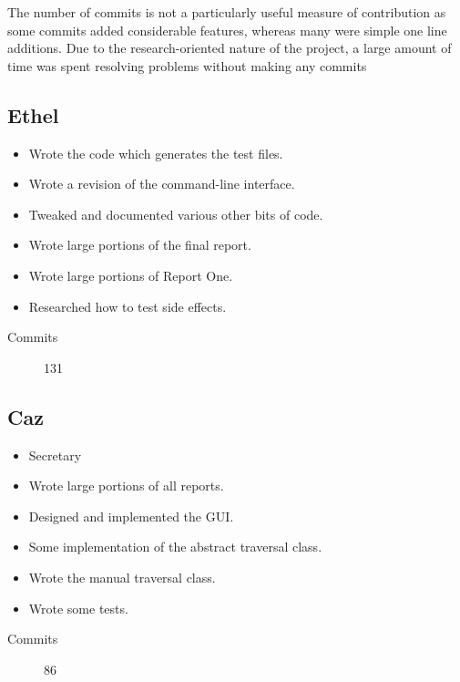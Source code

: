   The number of commits is not a particularly useful measure of contribution as some commits added considerable features, whereas many were simple one line additions. 
  Due to the research-oriented nature of the project, a large amount of time was spent resolving problems without making any commits

  \subsection{Ethel}
    \begin{itemize}
      \item Wrote the code which generates the test files.
      \item Wrote a revision of the command-line interface.
      \item Tweaked and documented various other bits of code.
      \item Wrote large portions of the final report.
      \item Wrote large portions of Report One.
      \item Researched how to test side effects.
    \end{itemize}
   
    \begin{description}
      \item[Commits] 131
    \end{description}

  \subsection{Caz}
    \begin{itemize}
    \item Secretary
    \item Wrote large portions of all reports.
    \item Designed and implemented the GUI.
    \item Some implementation of the abstract traversal class.
    \item Wrote the manual traversal class.
    \item Wrote some tests.
    \end{itemize}
    \begin{description}
      \item[Commits] 86
    \end{description}

